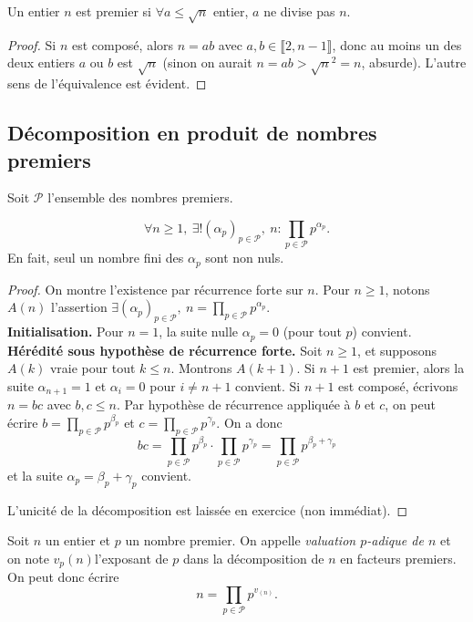 \begin{proposition}
Un entier $n$ est premier si $\forall a \leq \sqrt n$ entier, $a$ ne divise pas $n$.
\end{proposition}
\begin{proof}
Si $n$ est composé, alors $n=ab$ avec $a, b \in \llbracket 2,n-1 \rrbracket$, donc au moins un des deux entiers $a$ ou $b$ est $\sqrt n$ (sinon on aurait $n=ab > \sqrt{n}^2=n$, absurde). L'autre sens de l'équivalence est évident.
\end{proof}



\subsection{Décomposition en produit de nombres premiers}
Soit $\mathcal P$ l'ensemble des nombres premiers.

\begin{proposition}
\[
\forall n\geq 1, \: \exists !  (\alpha_p)_{p\in \mathcal P}, \: n : \prod_{p\in \mathcal P} p^{\alpha_p}.
\]
En fait, seul un nombre fini des $\alpha_p$ sont non nuls.
\end{proposition}
\begin{proof}
On montre l'existence par récurrence forte sur $n$. Pour $n\geq 1$, notons $A(n)$ l'assertion  $\exists  (\alpha_p)_{p\in \mathcal P}, \: n = \prod_{p\in \mathcal P} p^{\alpha_p}$.\\

\textbf{Initialisation.} Pour $n=1$, la suite nulle $\alpha_p = 0$ (pour tout $p$) convient.\\

\textbf{Hérédité sous hypothèse de récurrence forte.} Soit $n\geq 1$, et supposons $A(k)$ vraie pour tout $k\leq n$. Montrons $A(k+1)$. Si $n+1$ est premier, alors la suite $\alpha_{n+1}=1$ et $\alpha_i=0$ pour $i\neq n+1$ convient. Si $n+1$ est composé, écrivons $n=bc$ avec $b,c\leq n$. Par hypothèse de récurrence appliquée à $b$ et $c$, on peut écrire $b=\prod_{p\in \mathcal P} p^{\beta_p}$ et $c=\prod_{p\in \mathcal P} p^{\gamma_p}$. On a donc 
\[ bc = \prod_{p\in \mathcal P} p^{\beta_p} \cdot \prod_{p\in \mathcal P} p^{\gamma_p}
= \prod_{p\in \mathcal P} p^{\beta_p+\gamma_p}\] et la suite $\alpha_p = \beta_p+\gamma_p$ convient.

L'unicité de la décomposition est laissée en exercice (non immédiat).
\end{proof}

\begin{definition}
Soit $n$ un entier et $p$ un nombre premier. On appelle \emph{valuation $p$-adique de $n$} et on note $v_p(n)$l'exposant de $p$ dans la décomposition de $n$ en facteurs premiers. On peut donc écrire 
\[ n = \prod_{p\in \mathcal P} p^{v_(n)}.\]
\end{definition}

